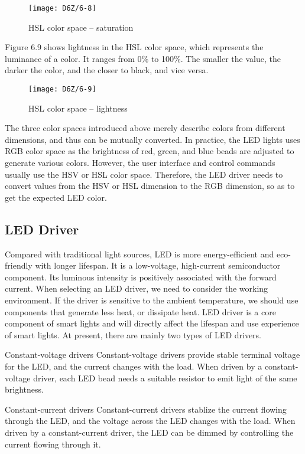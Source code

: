 \documentclass[a4paper,12pt]{book}
\begin{document}
\begin{figure}[h!]
    \centering
    \texttt{[image: D6Z/6-8]}
    \caption{HSL color space – saturation}
\end{figure}

Figure 6.9 shows lightness in the HSL color space, which represents the luminance of a color. It ranges from 0\% to 100\%. The smaller the value, the darker the color, and the closer to black, and vice versa.

\begin{figure}[h!]
    \centering
    \texttt{[image: D6Z/6-9]}
    \caption{HSL color space – lightness}
\end{figure}

The three color spaces introduced above merely describe colors from different dimensions, and thus can be mutually converted. In practice, the LED lights uses RGB color space as the brightness of red, green, and blue beads are adjusted to generate various colors. However, the user interface and control commands usually use the HSV or HSL color space. Therefore, the LED driver needs to convert values from the HSV or HSL dimension to the RGB dimension, so as to get the expected LED color.

\subsection{LED Driver}
Compared with traditional light sources, LED is more energy-efficient and eco-friendly with longer lifespan. It is a low-voltage, high-current semiconductor component. Its luminous intensity is positively associated with the forward current. When selecting an LED driver, we need to consider the working environment. If the driver is sensitive to the ambient temperature, we should use components that generate less heat, or dissipate heat. LED driver is a core component of smart lights and will directly affect the lifespan and use experience of smart lights. At present, there are mainly two types of LED drivers.

\begin{term}{Constant-voltage drivers}
    Constant-voltage drivers provide stable terminal voltage for the LED, and the current changes with the load. When driven by a constant-voltage driver, each LED bead needs a suitable resistor to emit light of the same brightness.
\end{term}

\begin{term}{Constant-current drivers}
    Constant-current drivers stablize the current flowing through the LED, and the voltage across the LED changes with the load. When driven by a constant-current driver, the LED can be dimmed by controlling the current flowing through it.
\end{term}
\end{document}
